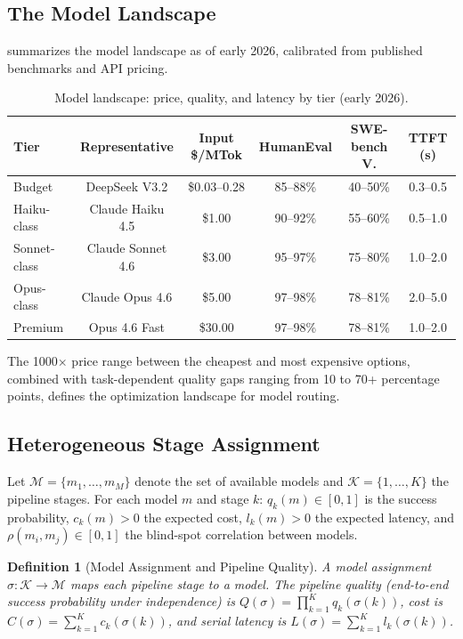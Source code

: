 \documentclass[11pt, a4paper]{googledeepmind}
\newtheorem{definition}{Definition}[section]
\begin{document}
\subsection{The Model Landscape}

 summarizes the model landscape as of early 2026, calibrated from published benchmarks and API pricing.

\begin{table}[htbp]
\centering
\caption{Model landscape: price, quality, and latency by tier (early 2026).}
\label{tab:model-landscape}
\small
\begin{tabular}{lccccc}
\toprule
\textbf{Tier} & \textbf{Representative} & \textbf{Input \$/MTok} & \textbf{HumanEval} & \textbf{SWE-bench V.} & \textbf{TTFT (s)} \\
\midrule
Budget & DeepSeek V3.2 & \$0.03--0.28 & 85--88\% & 40--50\% & 0.3--0.5 \\
Haiku-class & Claude Haiku 4.5 & \$1.00 & 90--92\% & 55--60\% & 0.5--1.0 \\
Sonnet-class & Claude Sonnet 4.6 & \$3.00 & 95--97\% & 75--80\% & 1.0--2.0 \\
Opus-class & Claude Opus 4.6 & \$5.00 & 97--98\% & 78--81\% & 2.0--5.0 \\
Premium & Opus 4.6 Fast & \$30.00 & 97--98\% & 78--81\% & 1.0--2.0 \\
\bottomrule
\end{tabular}
\end{table}

The 1000$\times$ price range between the cheapest and most expensive options, combined with task-dependent quality gaps ranging from 10 to 70+ percentage points, defines the optimization landscape for model routing.

\subsection{Heterogeneous Stage Assignment}

Let $\mathcal{M} = \{m_1, \ldots, m_M\}$ denote the set of available models and $\mathcal{K} = \{1, \ldots, K\}$ the pipeline stages. For each model $m$ and stage $k$: $q_k(m) \in [0,1]$ is the success probability, $c_k(m) > 0$ the expected cost, $l_k(m) > 0$ the expected latency, and $\rho(m_i, m_j) \in [0,1]$ the blind-spot correlation between models.

\begin{definition}[Model Assignment and Pipeline Quality]
\label{def:model-assignment}
A \emph{model assignment} $\sigma: \mathcal{K} \to \mathcal{M}$ maps each pipeline stage to a model. The pipeline quality (end-to-end success probability under independence) is $Q(\sigma) = \prod_{k=1}^{K} q_k(\sigma(k))$, cost is $C(\sigma) = \sum_{k=1}^{K} c_k(\sigma(k))$, and serial latency is $L(\sigma) = \sum_{k=1}^{K} l_k(\sigma(k))$.
\end{definition}
\end{document}
